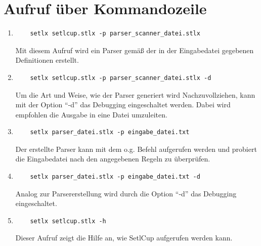 \section{Aufruf über Kommandozeile}
\begin{enumerate}
	\item \begin{Verbatim}
	setlx setlcup.stlx -p parser_scanner_datei.stlx
	\end{Verbatim}
			Mit diesem Aufruf wird ein Parser gemäß der in der Eingabedatei gegebenen Definitionen erstellt.
	\item \begin{Verbatim}
	setlx setlcup.stlx -p parser_scanner_datei.stlx -d
	\end{Verbatim}
			Um die Art und Weise, wie der Parser generiert wird Nachzuvollziehen, kann mit der Option "`-d"' das Debugging eingeschaltet werden. Dabei wird empfohlen die Ausgabe in eine Datei umzuleiten.
	\item \begin{Verbatim}
	setlx parser_datei.stlx -p eingabe_datei.txt
	\end{Verbatim}
	Der erstellte Parser kann mit dem o.g. Befehl aufgerufen werden und probiert die Eingabedatei nach den angegebenen Regeln zu überprüfen.
		\item \begin{Verbatim}
	setlx parser_datei.stlx -p eingabe_datei.txt -d
	\end{Verbatim}
	Analog zur Parsererstellung wird durch die Option "`-d"' das Debugging eingeschaltet.
	\item \begin{Verbatim}
	setlx setlcup.stlx -h
	\end{Verbatim}
			Dieser Aufruf zeigt die Hilfe an, wie SetlCup aufgerufen werden kann.
\end{enumerate}
